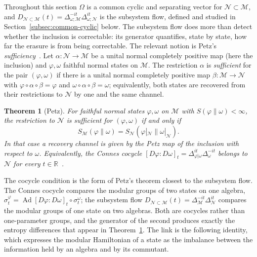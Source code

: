 \documentclass[a4paper,11pt]{article}
\newtheorem{theorem}{Theorem}
\theoremstyle{definition}
\newcommand{\mN}{\mathcal{N}}
\newcommand{\mM}{\mathcal{M}}
\begin{document}
Throughout this section $\Omega$ is a common cyclic and separating vector for $\mN\subset\mM$, and $D_{\mN\subset\mM}(t)=\Delta_{\omega;\mM}^{-it}\Delta_{\omega;\mN}^{it}$ is the subsystem flow, defined and studied in Section~\ref{subsec:common-cyclic} below. The subsystem flow does more than detect whether the inclusion is correctable: its generator quantifies, state by state, how far the erasure is from being correctable. The relevant notion is Petz's \emph{sufficiency}~\cite{Petz1986,Petz1988,OhyaPetz1993}. Let $\alpha:\mN\to\mM$ be a unital normal completely positive map (here the inclusion) and $\varphi,\omega$ faithful normal states on $\mM$. The restriction $\alpha$ is \emph{sufficient} for the pair $(\varphi,\omega)$ if there is a unital normal completely positive map $\beta:\mM\to\mN$ with $\varphi\circ\alpha\circ\beta=\varphi$ and $\omega\circ\alpha\circ\beta=\omega$; equivalently, both states are recovered from their restrictions to $\mN$ by one and the same channel.

\begin{theorem}[Petz]\label{thm:Petz}
For faithful normal states $\varphi,\omega$ on $\mM$ with $S(\varphi\|\omega)<\infty$, the restriction to $\mN$ is sufficient for $(\varphi,\omega)$ if and only if
\[
 S_{\mM}(\varphi\|\omega)=S_{\mN}(\varphi|_{\mN}\|\omega|_{\mN}) .
\]
In that case a recovery channel is given by the Petz map of the inclusion with respect to $\omega$. Equivalently, the Connes cocycle $[D\varphi:D\omega]_t=\Delta_{\varphi|\omega}^{it}\Delta_{\omega}^{-it}$ belongs to $\mN$ for every $t\in\mathbb R$~\cite{Petz1988,JencovaPetz2006}.
\end{theorem}

The cocycle condition is the form of Petz's theorem closest to the subsystem flow. The Connes cocycle compares the modular groups of two states on one algebra, $\sigma^{\varphi}_t=\operatorname{Ad}[D\varphi:D\omega]_t\circ\sigma^{\omega}_t$; the subsystem flow $D_{\mN\subset\mM}(t)=\Delta_{\mM}^{-it}\Delta_{\mN}^{it}$ compares the modular groups of one state on two algebras. Both are cocycles rather than one-parameter groups, and the generator of the second produces exactly the entropy differences that appear in Theorem~\ref{thm:Petz}. The link is the following identity, which expresses the modular Hamiltonian of a state as the imbalance between the information held by an algebra and by its commutant.
\end{document}
